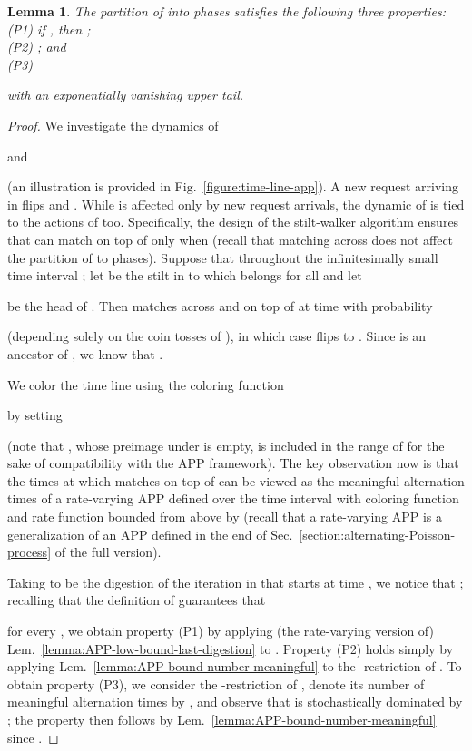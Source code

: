 \documentclass[11pt]{article}
\def\LongVersion{}
\def\LongVersionEnd{}
\newtheorem{lemma}[theorem]{Lemma}
\theoremstyle{definition}
\theoremstyle{plain}
\newtheorem{lemma}[theorem]{Lemma}
\theoremstyle{definition}
\theoremstyle{plain}
\newtheorem{lemma}{Lemma}[section]
\theoremstyle{definition}
\theoremstyle{plain}
\newcommand{\Sect}{Sec.}
\newcommand{\Lem}{Lem.}
\newcommand{\Fig}{Fig.}
\begin{document}
\begin{lemma} \label{lemma:partition-time-line-into-phases}
The partition of  into phases satisfies the following three
properties: \\
(P1)
if
,
then
; \\
(P2)
; and \\
(P3)

with an exponentially vanishing upper tail.
\end{lemma}
\LongVersion \begin{proof}
We investigate the dynamics of

and

(an illustration is provided in \Fig{}~\ref{figure:time-line-app}).
A new request arriving in  flips  and .
While  is affected only by new request arrivals, the dynamic of  is tied
to the actions of  too.
Specifically, the design of the stilt-walker algorithm ensures that  can
match on top of  only when  (recall that matching across  does
not affect the partition of  to phases).
Suppose that  throughout the infinitesimally small time
interval
;
let  be the stilt in  to which  belongs for all 
and let

be the head of .
Then  matches across  and on top of  at time  with probability

(depending solely on the coin tosses of ), in which case  flips to
.
Since  is an ancestor of , we know that
.

We color the time line using the coloring function

by setting

(note that , whose preimage under  is empty, is included in the range
of  for the sake of compatibility with the APP framework).
The key observation now is that the times at which  matches on top of 
can be viewed as the meaningful alternation times of a rate-varying APP
 defined over the time interval  with
coloring function  and rate function bounded from above by  (recall that a rate-varying APP is a generalization of an APP defined in
the end of \Sect{}~\ref{section:alternating-Poisson-process} of the full
version).


\sloppy
Taking  to be the digestion of the iteration in
 that starts at time
,
we notice that
;
recalling that the definition of  guarantees that

for every
,
we obtain property (P1) by applying (the rate-varying version of)
\Lem{}~\ref{lemma:APP-low-bound-last-digestion} to .
Property (P2) holds simply by applying
\Lem{}~\ref{lemma:APP-bound-number-meaningful} to the -restriction of .
To obtain property (P3), we consider the -restriction
of , denote its number of meaningful alternation times by
, and observe that  is stochastically dominated by ;
the property then follows by \Lem{}~\ref{lemma:APP-bound-number-meaningful}
since
.
\end{proof}
\par\fussy
\LongVersionEnd 
\end{document}
